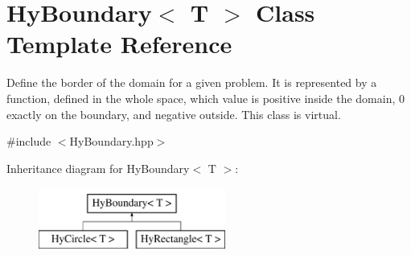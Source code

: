 \hypertarget{classHyBoundary}{
\section{HyBoundary$<$ T $>$ Class Template Reference}
\label{classHyBoundary}
}


Define the border of the domain for a given problem. It is represented by a function, defined in the whole space, which value is positive inside the domain, 0 exactly on the boundary, and negative outside. This class is virtual.  




{\ttfamily \#include $<$HyBoundary.hpp$>$}

Inheritance diagram for HyBoundary$<$ T $>$:\begin{figure}[H]
\begin{center}
\leavevmode
\includegraphics[height=2cm]{classHyBoundary}
\end{center}
\end{figure}
